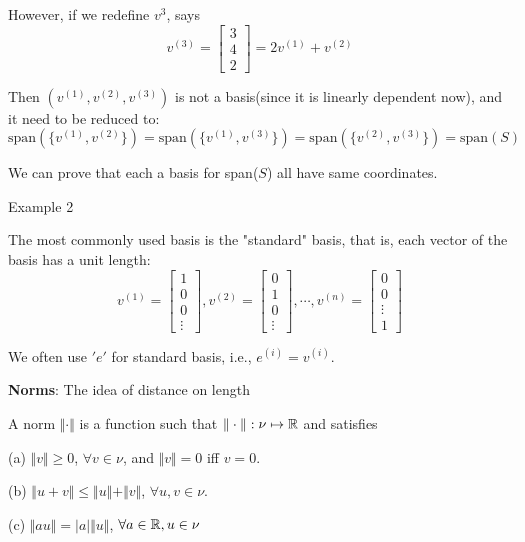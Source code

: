 However, if we redefine $v^{3}$, says
$$v^{(3)}= 
\left[ 
\begin{array}{c} 
3 \\
4 \\
2
\end{array}
\right]
=2v^{(1)}+v^{(2)}$$

Then $\left(v^{(1)},v^{(2)}, v^{(3)}\right)$ is not a basis(since it is linearly dependent now), and it need to be reduced to:
$$\text{span}\left(\{v^{(1)},v^{(2)}\}\right)=\text{span}\left(\{v^{(1)},v^{(3)}\}\right)=\text{span}\left(\{v^{(2)},v^{(3)}\}\right)=\text{span}(S)$$

We can prove that each a basis for span($S$) all have same coordinates.

\vspace{0.3cm}
Example 2

The most commonly used basis is the "standard" basis, that is, each vector of the basis has a unit length:
$$v^{(1)}= 
\left[ 
\begin{array}{c} 
1 \\
0 \\
0 \\
\vdots
\end{array}
\right],
v^{(2)}= 
\left[ 
\begin{array}{c} 
0 \\
1 \\
0 \\
\vdots
\end{array}
\right], \cdots,
v^{(n)}= 
\left[ 
\begin{array}{c} 
0 \\
0 \\
\vdots \\
1 
\end{array}
\right]$$

We often use $'e'$ for standard basis, i.e., $e^{(i)}=v^{(i)}$.

\vspace{0.5cm}
\noindent\textbf{Norms}: The idea of distance on length

A norm $\Vert\cdot\Vert$ is a function such that $\Vert\cdot\Vert : \nu\mapsto\mathbb{R}$
and satisfies

(a) $\Vert v \Vert\geq 0$, $\forall v\in \nu$, and $\Vert v \Vert=0$ iff $v=0$.

(b) $\Vert u+v \Vert\leq \Vert u \Vert+\Vert v \Vert$, $\forall u, v\in \nu$.

(c) $\Vert au \Vert= \vert a\vert\Vert u \Vert$, $\forall a\in\mathbb{R}, u\in\nu$

